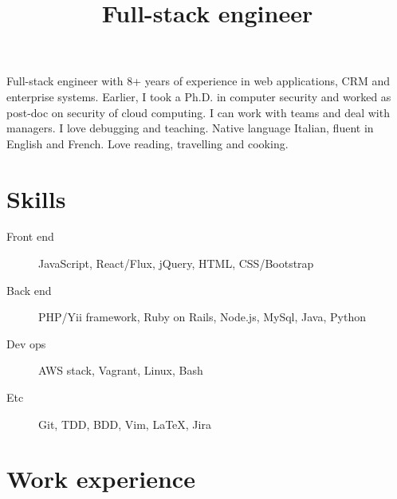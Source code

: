 \documentclass[a4paper,sans,10pt]{moderncv} %
\title{Full-stack engineer}
\newcommand{\experience}{Experience}
\newcommand{\skills}{Computer Skills}
\renewcommand{\experience}{Esperienze di lavoro}
\renewcommand{\skills}{Competenze informatiche}
\renewcommand{\experience}{Work experience}
\renewcommand{\skills}{Skills}
\begin{document}
\maketitle

	\vspace{-1.5em}  %
\justify
Full-stack engineer with 8+ years of experience in web applications, CRM and enterprise systems.
Earlier, I took a Ph.D. in computer security and worked as post-doc on security of cloud computing.
I can work with teams and deal with managers. I love debugging and teaching. Native language Italian, fluent in English and French. Love reading, travelling and cooking.

\section{\skills}
\begin{description}
\item [Front end] JavaScript, React/Flux, jQuery, HTML, CSS/Bootstrap
\item [Back end] PHP/Yii framework, Ruby on Rails, Node.js, MySql, Java, Python
\item [Dev ops] AWS stack, Vagrant, Linux, Bash
\item [Etc] Git, TDD, BDD, Vim, \LaTeX, Jira
\end{description}

  \section{\experience}
\end{document}
